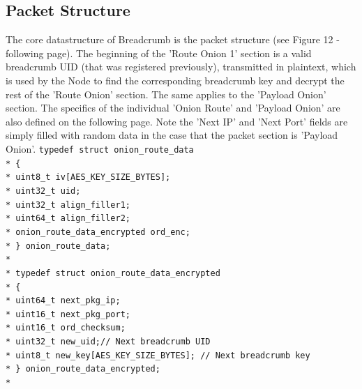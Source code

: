 \documentclass{article}
\begin{document}
\subsection{Packet Structure}
The core datastructure of Breadcrumb is the packet structure (see Figure 12 - following page). The beginning of the 'Route Onion 1' section is a valid breadcrumb UID (that was registered previously),
transmitted in plaintext, which is used by the Node to find the corresponding breadcrumb key and decrypt the rest of the 'Route Onion' section. The same applies to the 'Payload Onion' section. The specifics of the individual 'Onion Route' and 'Payload Onion' are also defined on the following page. Note the 'Next IP' and 'Next Port' fields are simply filled with random data in the case that the packet section is 'Payload Onion'.
\newpage
\texttt{\-\hspace{0.5cm}typedef struct onion\_route\_data\\*
\-\hspace{1cm}\{\\*
\-\hspace{2cm}uint8\_t iv[AES\_KEY\_SIZE\_BYTES];\\*
\-\hspace{2cm}uint32\_t uid;\\*
\-\hspace{2cm}uint32\_t align\_filler1;\\*
\-\hspace{2cm}uint64\_t align\_filler2;\\*
\-\hspace{2cm}onion\_route\_data\_encrypted ord\_enc;\\*
\-\hspace{1cm}\} onion\_route\_data;\\*\\*
\-\hspace{1cm}typedef struct onion\_route\_data\_encrypted\\*
\-\hspace{1cm}\{\\*
\-\hspace{2cm}uint64\_t next\_pkg\_ip;\\*
\-\hspace{2cm}uint16\_t next\_pkg\_port;\\*
\-\hspace{2cm}uint16\_t ord\_checksum;\\*
\-\hspace{2cm}uint32\_t new\_uid;\-\hspace{3.5cm}// Next breadcrumb UID\\*
\-\hspace{2cm}uint8\_t new\_key[AES\_KEY\_SIZE\_BYTES]; // Next breadcrumb key\\*
\-\hspace{1cm}\} onion\_route\_data\_encrypted;\\*}
\end{document}
